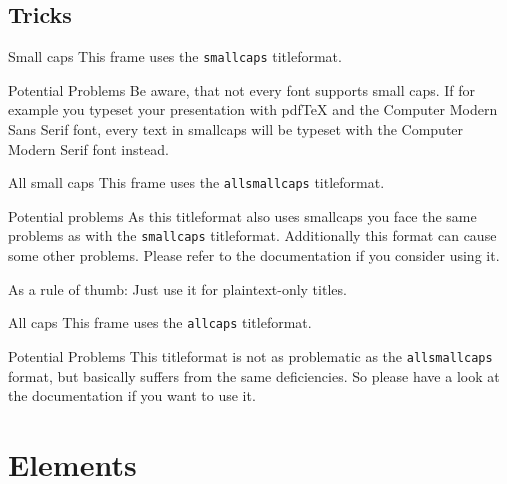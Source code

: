 \documentclass[12pt]{beamer}
\begin{document}
	\subsection{Tricks}
	
	{
		\begin{frame}{Small caps}
			This frame uses the \texttt{smallcaps} titleformat.
			
			\begin{alertblock}{Potential Problems}
				Be aware, that not every font supports small caps. If for 						example you typeset your presentation with pdfTeX and the 						Computer Modern Sans Serif font, every text in smallcaps will 					be typeset with the Computer Modern Serif font instead.
			\end{alertblock}
		\end{frame}
	}
	
	{
		\begin{frame}{All small caps}
			This frame uses the \texttt{allsmallcaps} titleformat.
			
			\begin{alertblock}{Potential problems}
				As this titleformat also uses smallcaps you face the same 						problems as with the \texttt{smallcaps} titleformat. 							Additionally this format can cause some other problems. Please 				refer to the documentation if you consider using it.
				
				As a rule of thumb: Just use it for plaintext-only titles.
			\end{alertblock}
		\end{frame}
	}
	
	{
		\begin{frame}{All caps}
			This frame uses the \texttt{allcaps} titleformat.
			
			\begin{alertblock}{Potential Problems}
				This titleformat is not as problematic as the 									\texttt{allsmallcaps} format, but basically suffers from the 					same deficiencies. So please have a look at the documentation 					if you want to use it.
			\end{alertblock}
		\end{frame}
	}
	
	\section{Elements}
	
\end{document}
